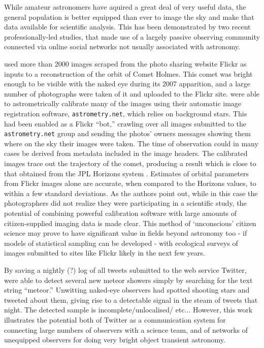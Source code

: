\documentclass{ar2e}
\begin{document}
While amateur astronomers have aquired a great deal of very useful data, the
general population is better equipped than ever to image the sky and make that
data available for scientific analysis. This has been demonstrated by two
recent professionally-led studies, that made use of a largely passive
observing community connected via online social networks not usually
associated with astronomy. 

\citet{Lang++2011} used more than 2000 images scraped from the photo sharing website Flickr
as inputs to a reconstruction of the orbit of Comet Holmes. This comet was
bright enough to be visible with the naked eye during its 2007 apparition, and a large number
of photographs were taken of it and uploaded to the Flickr site.
\citeauthor{Lang++2011} were able to astrometrically calibrate many of the images using their automatic
image registration software, \texttt{astrometry.net}, which relies on background stars. This had been enabled as
a Flickr ``bot,'' crawling over all images submitted to the
\texttt{astrometry.net} group and sending the photos' owners messages showing
them where on the sky their images were taken.  The time of observation could in many cases be derived from metadata included in the image headers. The calibrated images trace out
the trajectory of the comet, producing a result which is close to that obtained from the JPL Horizons system \citep{Giorgini}. Estimates of orbital parameters from Flickr images alone are accurate, when compared to the Horizons values, to within a few standard deviations. As the authors point out, while in this case the
photographers did not realize they were participating in a scientific study,
the potential of combining powerful calibration software with large amounts of
citizen-supplied imaging data is made clear. This method of `unconscious' citizen science may prove to have significant value in fields beyond astronomy too - if models of statistical sampling can be developed - with ecological surveys of images submitted to sites like Flickr likely in the next few years. 

By saving a nightly (?) log of all tweets submitted to the web service
Twitter, \citet{Barentsen++2010} were able to 
detect several new meteor showers simply by searching for the text string
``meteor.'' Unwitting naked-eye observers had spotted shooting stars and
tweeted about them, giving rise to a detectable signal in the steam of tweets
that night. The detected sample is incomplete/unlocalised/ etc... However,
this work illustrates the potential both of Twitter as a communication system
for connecting large numbers of observers with a science team, and of networks
of unequipped observers for doing very bright object transient astronomy.
\end{document}
